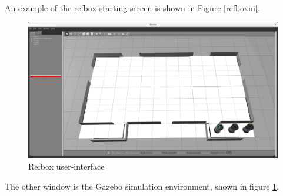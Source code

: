 \documentclass[oribibl]{llncs}
\begin{document}
An example of the refbox starting screen is shown in Figure \ref{refboxui}.
\newpage
\begin{figure}
        \centering
        \includegraphics[width=\textwidth]{images/gazebo_start.png}
        \caption{Refbox user-interface}
        \label{gazebostart}
\end{figure}
The other window is the Gazebo simulation environment, shown in figure \ref{gazebostart}.
\end{document}
